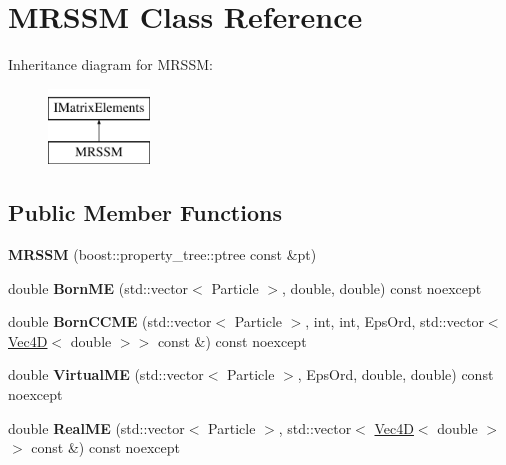 \hypertarget{classMRSSM}{}\section{M\+R\+S\+SM Class Reference}
\label{classMRSSM}
Inheritance diagram for M\+R\+S\+SM\+:\begin{figure}[H]
\begin{center}
\leavevmode
\includegraphics[height=2.000000cm]{classMRSSM}
\end{center}
\end{figure}
\subsection*{Public Member Functions}
\begin{DoxyCompactItemize}
\item 
\mbox{\label{classMRSSM_a3f485c123c2d3efed9ec9950db329815}} 
{\bfseries M\+R\+S\+SM} (boost\+::property\+\_\+tree\+::ptree const \&pt)
\item 
\mbox{\label{classMRSSM_a4bf29333db6df3962e1f96873af1e8a1}} 
double {\bfseries Born\+ME} (std\+::vector$<$ Particle $>$, double, double) const noexcept
\item 
\mbox{\label{classMRSSM_a4b21e302b6f3cf4d8c417a0282468709}} 
double {\bfseries Born\+C\+C\+ME} (std\+::vector$<$ Particle $>$, int, int, Eps\+Ord, std\+::vector$<$ \hyperlink{classVec4D}{Vec4D}$<$ double $>$$>$ const \&) const noexcept
\item 
\mbox{\label{classMRSSM_aab207a9ec80cd70299012cd19cfbf96f}} 
double {\bfseries Virtual\+ME} (std\+::vector$<$ Particle $>$, Eps\+Ord, double, double) const noexcept
\item 
\mbox{\label{classMRSSM_ab89a86a500c8946a477ec8f6bdd2fba5}} 
double {\bfseries Real\+ME} (std\+::vector$<$ Particle $>$, std\+::vector$<$ \hyperlink{classVec4D}{Vec4D}$<$ double $>$$>$ const \&) const noexcept
\end{DoxyCompactItemize}
